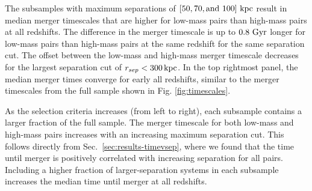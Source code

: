 \documentclass[twocolumn,linenumbers]{aastex631}
\begin{document}
        
        The subsamples with maximum separations of $[50, 70, \mbox{and } 100]\,\mathrm{\,kpc}$ result in median merger timescales that are higher for low-mass pairs than high-mass pairs at all redshifts. 
        The difference in the merger timescale is up to $0.8\,\mathrm{\,Gyr}$ longer for low-mass pairs than high-mass pairs at the same redshift for the same separation cut. 
        The offset between the low-mass and high-mass merger timescale decreases for the largest separation cut of $r_{sep}<300\mathrm{\,kpc}$. 
        In the top rightmost panel, the median merger times converge for early all redshifts, similar to the merger timescales from the full sample shown in Fig. \ref{fig:timescales}.
        
        As the selection criteria increases (from left to right), each subsample contains a larger fraction of the full sample.
        The merger timescale for both low-mass and high-mass pairs increases with an increasing maximum separation cut.  
        This follows directly from Sec.~\ref{sec:results-timevsep}, where we found that the time until merger is positively correlated with increasing separation for all pairs. 
        Including a higher fraction of larger-separation systems in each subsample increases the median time until merger at all redshifts. 
        
\end{document}
